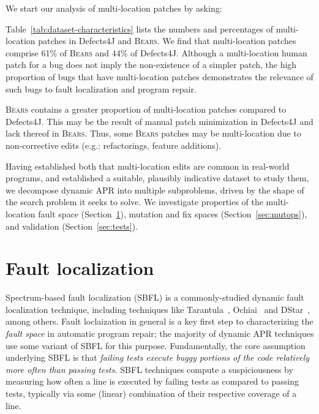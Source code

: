 \documentclass[10pt, conference]{IEEEtran}
\newcommand\bears{\textsc{Bears}\xspace}
\begin{document}
We start our analysis of multi-location patches by asking:

Table~\ref{tab:dataset-characteristics} lists the numbers and percentages of
multi-location patches in Defects4J and \bears. 
We find that multi-location patches comprise 61\% of \bears and 44\% of Defects4J.
Although a multi-location human patch for a bug does not imply the 
non-existence of a simpler patch, the high proportion of bugs that have 
multi-location patches demonstrates the relevance of such bugs to fault localization and
program repair. 

\bears contains a greater proportion of 
multi-location patches compared to Defects4J. This may be the 
result of manual patch minimization in Defects4J
and lack thereof in \bears.
Thus, some \bears patches may be multi-location due to
non-corrective edits (e.g.: refactorings, feature additions).

Having established both that multi-location edits are common in real-world
programs, and established a suitable, plausibly indicative dataset to study
them, we decompose dynamic APR into multiple subproblems, driven by the
shape of the search problem it seeks to solve. We 
investigate properties of the multi-location fault space (Section~\ref{secFL}),
mutation and fix spaces (Section~\ref{sec:mutops}), and validation
(Section~\ref{sec:tests}). 

\section{Fault localization} \label{secFL}


Spectrum-based fault localization (SBFL) is a commonly-studied dynamic
fault localization technique, including techniques like Tarantula~\cite{tarantula},
Ochiai~\cite{ochiai} and DStar~\cite{wong2013dstar}, among others.
Fault loclaization in general is a key first step to characterizing the
\emph{fault space} in automatic program repair; the majority of dynamic APR
techniques use some variant of SBFL for this purpose.
%
Fundamentally, the core assumption underlying SBFL is that \emph{failing tests
  execute buggy portions of the code relatively more often than passing tests.}
SBFL techniques compute a suspiciousness by
measuring how often a line is executed by failing tests as compared to passing
tests, typically via some (linear) combination of their respective
coverage of a line.
\end{document}
